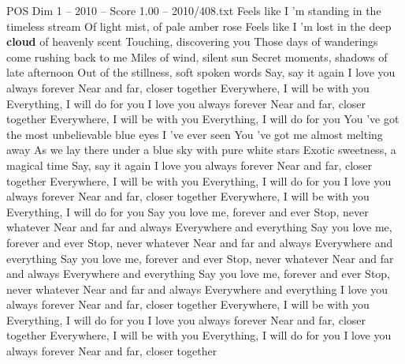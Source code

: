 \begin{textsample}{POS Dim 1 – 2010 – Score 1.00 – 2010/408.txt}  \label{ex:f1_pos_030}
Feels like I 'm standing in the timeless stream Of light mist, of pale amber rose Feels like I 'm lost in the deep \textbf{cloud} of heavenly scent Touching, discovering you Those days of wanderings come rushing back to me Miles of wind, silent sun Secret moments, shadows of late afternoon Out of the stillness, soft spoken words Say, say it again I love you always forever Near and far, closer together Everywhere, I will be with you Everything, I will do for you I love you always forever Near and far, closer together Everywhere, I will be with you Everything, I will do for you You 've got the most unbelievable blue eyes I 've ever seen You 've got me almost melting away As we lay there under a blue sky with pure white stars Exotic sweetness, a magical time Say, say it again I love you always forever Near and far, closer together Everywhere, I will be with you Everything, I will do for you I love you always forever Near and far, closer together Everywhere, I will be with you Everything, I will do for you Say you love me, forever and ever Stop, never whatever Near and far and always Everywhere and everything Say you love me, forever and ever Stop, never whatever Near and far and always Everywhere and everything Say you love me, forever and ever Stop, never whatever Near and far and always Everywhere and everything Say you love me, forever and ever Stop, never whatever Near and far and always Everywhere and everything I love you always forever Near and far, closer together Everywhere, I will be with you Everything, I will do for you I love you always forever Near and far, closer together Everywhere, I will be with you Everything, I will do for you I love you always forever Near and far, closer together

\end{textsample}
